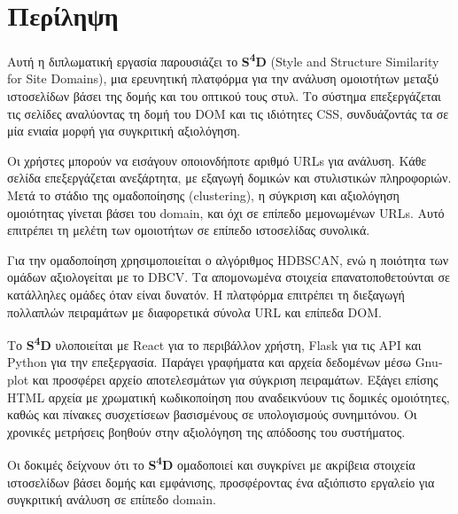 \newpage
{}
\chapter*{Περίληψη}

Αυτή η διπλωματική εργασία παρουσιάζει το \textlatin{\textbf{S\textsuperscript{4}D} (Style and Structure Similarity for Site Domains)}, μια ερευνητική πλατφόρμα για την ανάλυση ομοιοτήτων μεταξύ ιστοσελίδων βάσει της δομής και του οπτικού τους στυλ. Το σύστημα επεξεργάζεται τις σελίδες αναλύοντας τη δομή του \textlatin{DOM} και τις ιδιότητες \textlatin{CSS}, συνδυάζοντάς τα σε μία ενιαία μορφή για συγκριτική αξιολόγηση.

Οι χρήστες μπορούν να εισάγουν οποιονδήποτε αριθμό \textlatin{URLs} για ανάλυση. Κάθε σελίδα επεξεργάζεται ανεξάρτητα, με εξαγωγή δομικών και στυλιστικών πληροφοριών. Μετά το στάδιο της ομαδοποίησης (\textlatin{clustering}), η σύγκριση και αξιολόγηση ομοιότητας γίνεται βάσει του \textlatin{domain}, και όχι σε επίπεδο μεμονωμένων \textlatin{URLs}. Αυτό επιτρέπει τη μελέτη των ομοιοτήτων σε επίπεδο ιστοσελίδας συνολικά.

Για την ομαδοποίηση χρησιμοποιείται ο αλγόριθμος \textlatin{HDBSCAN}, ενώ η ποιότητα των ομάδων αξιολογείται με το \textlatin{DBCV}. Τα απομονωμένα στοιχεία επανατοποθετούνται σε κατάλληλες ομάδες όταν είναι δυνατόν. Η πλατφόρμα επιτρέπει τη διεξαγωγή πολλαπλών πειραμάτων με διαφορετικά σύνολα \textlatin{URL} και επίπεδα \textlatin{DOM}.

Το \textlatin{\textbf{S\textsuperscript{4}D}} υλοποιείται με \textlatin{React} για το περιβάλλον χρήστη, \textlatin{Flask} για τις \textlatin{API} και \textlatin{Python} για την επεξεργασία. Παράγει γραφήματα και αρχεία δεδομένων μέσω \textlatin{Gnuplot} και προσφέρει αρχείο αποτελεσμάτων για σύγκριση πειραμάτων. Εξάγει επίσης \textlatin{HTML} αρχεία με χρωματική κωδικοποίηση που αναδεικνύουν τις δομικές ομοιότητες, καθώς και πίνακες συσχετίσεων βασισμένους σε υπολογισμούς συνημιτόνου. Οι χρονικές μετρήσεις βοηθούν στην αξιολόγηση της απόδοσης του συστήματος.

Οι δοκιμές δείχνουν ότι το \textlatin{\textbf{S\textsuperscript{4}D}} ομαδοποιεί και συγκρίνει με ακρίβεια στοιχεία ιστοσελίδων βάσει δομής και εμφάνισης, προσφέροντας ένα αξιόπιστο εργαλείο για συγκριτική ανάλυση σε επίπεδο \textlatin{domain}.
